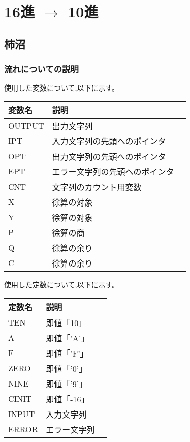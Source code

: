 \documentclass[dvipdfmx,12pt]{jreport}
\begin{document}
\section*{16進 $\rightarrow$ 10進}
\subsection*{柿沼}
\subsubsection*{流れについての説明}
使用した変数について,以下に示す。
\begin{table}[h]
  \begin{tabular}{|l|l|l|} \hline
    変数名 & 説明 \\ \hline
    OUTPUT & 出力文字列 \\ \hline
    IPT & 入力文字列の先頭へのポインタ \\ \hline
    OPT & 出力文字列の先頭へのポインタ \\ \hline
    EPT & エラー文字列の先頭へのポインタ \\ \hline
    CNT & 文字列のカウント用変数 \\ \hline
    X & 徐算の対象 \\ \hline
    Y & 徐算の対象 \\ \hline
    P & 徐算の商 \\ \hline
    Q & 徐算の余り \\ \hline
    C & 徐算の余り \\ \hline
  \end{tabular}
\end{table}
使用した定数について,以下に示す。
\begin{table}[h]
  \begin{tabular}{|l|l|l|} \hline
    定数名 & 説明 \\ \hline
    TEN & 即値「10」 \\ \hline
    A & 即値「'A'」 \\ \hline
    F & 即値「'F'」 \\ \hline
    ZERO & 即値「'0'」 \\ \hline
    NINE & 即値「'9'」 \\ \hline
    CINIT & 即値「-16」 \\ \hline
    INPUT & 入力文字列 \\ \hline
    ERROR & エラー文字列 \\ \hline
  \end{tabular}
\end{table}
\end{document}
